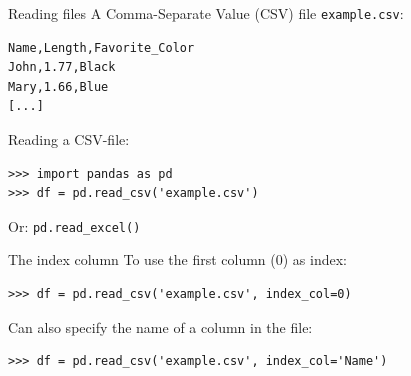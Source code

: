 \documentclass[aspectratio=169,usenames,dvipsnames]{beamer}
\begin{document}





















\begin{frame}[fragile]{Reading files}
A Comma-Separate Value (CSV) file \texttt{example.csv}:

\begin{lstlisting}[style=plain]
Name,Length,Favorite_Color
John,1.77,Black
Mary,1.66,Blue
[...]
\end{lstlisting}

Reading a CSV-file:
\begin{lstlisting}
>>> import pandas as pd
>>> df = pd.read_csv('example.csv')
\end{lstlisting}

Or: \texttt{pd.read\_excel()}
\end{frame}

\begin{frame}[fragile]{The index column}
To use the first column (0) as index:
\begin{lstlisting}
>>> df = pd.read_csv('example.csv', index_col=0)
\end{lstlisting}

Can also specify the name of a column in the file:

\begin{lstlisting}
>>> df = pd.read_csv('example.csv', index_col='Name')
\end{lstlisting}
\end{frame}
\end{document}
